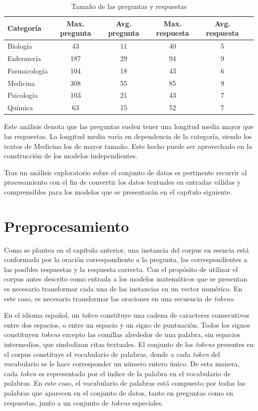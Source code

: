 \begin{table}[!tb]
  \begin{center}
    \caption{Tamaño de las preguntas y respuestas}
    \begin{tabular}{l|c|c|c|c|c}
      \textbf{Categoría} & \textbf{Max. pregunta} & \textbf{Avg. pregunta} & \textbf{Max. respuesta} & \textbf{Avg. respuesta} \\
      \hline
      Biología & 43 & 11 & 40 & 5 \\
      Enfermería & 187 & 29 & 94 & 9 \\
      Farmacología & 104 & 18 & 43 & 6 \\
      Medicina & 308 & 55 & 85 & 9 \\
      Psicología & 103 & 21 & 43 & 7 \\
      Química & 63 & 15 & 52 & 7 \\     
    \end{tabular}
  \end{center}
  \label{count}
\end{table}

Este análisis denota que las preguntas suelen tener una longitud media mayor que las respuestas. La longitud media varía en dependencia de la categoría, siendo los textos de Medicina los de mayor tamaño. Este hecho puede ser aprovechado en la construcción de los modelos independientes.

Tras un análisis exploratorio sobre el conjunto de datos es pertinente recurrir al procesamiento con el fin de convertir los datos textuales en entradas válidas y comprensibles para los modelos que se presentarán en el capítulo siguiente. 

\section{Preprocesamiento}

Como se plantea en el capítulo anterior, una instancia del corpus en esencia está conformada por la oración correspondiente a la pregunta, las correspondientes a las posibles respuestas y la respuesta correcta. Con el propósito de utilizar el corpus antes descrito como entrada a los modelos matemáticos que se presentan es necesario transformar cada una de las instancias en un vector numérico. En este caso, es necesario transformar las oraciones en una secuencia de \textit{tokens}.

En el idioma español, un \textit{token} constituye una cadena de caracteres consecutivos entre dos espacios, o entre un espacio y un signo de puntuación. Todos los signos constituyen \textit{tokens} excepto las comillas alrededor de una palabra, sin espacios intermedios, que simbolizan citas textuales. El conjunto de los \textit{tokens} presentes en el corpus constituye el vocabulario de palabras, donde a cada \textit{token} del vocabulario se le hace corresponder un número entero único. De esta manera, cada \textit{token} es representado por el índice de la palabra en el vocabulario de palabras. En este caso, el vocabulario de palabras está compuesto por todas las palabras que aparecen en el conjunto de datos, tanto en preguntas como en respuestas, junto a un conjunto de \textit{tokens} especiales.

